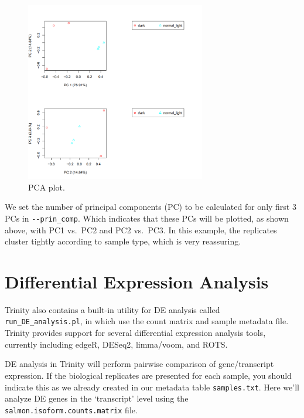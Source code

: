 \documentclass[
  letterpaper,
  DIV=11,
  numbers=noendperiod]{scrreprt}
\begin{document}
\begin{figure}

{\centering \includegraphics[width=0.7\textwidth,height=\textheight]{assets/34_PCA.png}

}

\caption{PCA plot.}

\end{figure}

We set the number of principal components (PC) to be calculated for only
first 3 PCs in \texttt{-\/-prin\_comp}. Which indicates that these PCs
will be plotted, as shown above, with PC1 vs.~PC2 and PC2 vs.~PC3. In
this example, the replicates cluster tightly according to sample type,
which is very reassuring.

\hypertarget{differential-expression-analysis}{%
\section{Differential Expression
Analysis}\label{differential-expression-analysis}}

Trinity also contains a built-in utility for DE analysis called
\texttt{run\_DE\_analysis.pl}, in which use the count matrix and sample
metadata file. Trinity provides support for several differential
expression analysis tools, currently including edgeR, DESeq2,
limma/voom, and ROTS.

DE analysis in Trinity will perform pairwise comparison of
gene/transcript expression. If the biological replicates are presented
for each sample, you should indicate this as we already created in our
metadata table \texttt{samples.txt}. Here we'll analyze DE genes in the
`transcript' level using the \texttt{salmon.isoform.counts.matrix} file.
\end{document}
